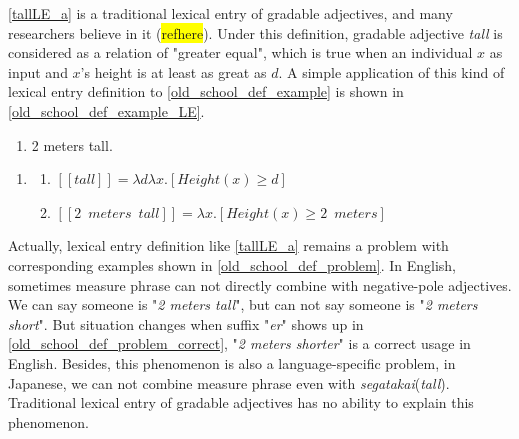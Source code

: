 \documentclass{ctexart}
\begin{document}
\ref{tallLE_a} is a traditional lexical entry of gradable adjectives, and many researchers believe in it (\colorbox{yellow}{refhere}). Under this definition, gradable adjective \textit{tall} is considered as a relation of "greater equal", which is true when an individual $x$ as input and $x$'s height is at least as great as $d$. A simple application of this kind of lexical entry definition to \ref{old_school_def_example} is shown in \ref{old_school_def_example_LE}.

\begin{enumerate}[resume]

    \item \label{old_school_def_example} 2 meters tall.

\end{enumerate}

\begin{enumerate}[resume]

    \item \label{old_school_def_example_LE}
    
    \begin{enumerate}[ref=(\arabic{enumi}\alph*)]
        
        \item $[\![tall]\!]=\lambda d \lambda x.[Height(x) \geq d]$
        \item $[\![2 \enspace meters \enspace tall]\!]=\lambda x.[Height(x) \geq 2 \enspace meters]$

    \end{enumerate}

\end{enumerate}

Actually, lexical entry definition like \ref{tallLE_a} remains a problem with corresponding examples shown in \ref{old_school_def_problem}. In English, sometimes measure phrase can not directly combine with negative-pole adjectives. We can say someone is "\textit{2 meters tall}", but can not say someone is "\textit{2 meters short}". But situation changes when suffix "\textit{er}" shows up in \ref{old_school_def_problem_correct}, "\textit{2 meters shorter}" is a correct usage in English. Besides, this phenomenon is also a language-specific problem, in Japanese, we can not combine measure phrase even with \textit{segatakai}(\textit{tall}). Traditional lexical entry of gradable adjectives has no ability to explain this phenomenon.
\end{document}
